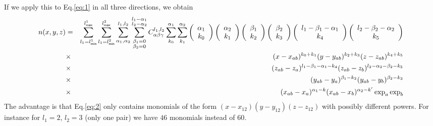 \documentclass[prb]{revtex4}
\begin{document}
If we apply this to Eq.\ref{eq:1} in all three directions, we obtain
\begin{eqnarray}
  \label{eq:collocate:4}
  n(x,y,z)  &=&
            \sum_{l_1 = l_{\sf min}^1}^{l_{\sf max}^1} \sum_{l_1 = l_{\sf min}^2}^{l_{\sf max}^2} \sum_{\alpha_1,\alpha_2}^{l_1,l_2} \sum_{\substack{\beta_1 = 0\\\beta_2 = 0}} ^{\substack{l_1 - \alpha_1\\l_2 - \alpha_2}}  C^{l_1,l_2}_{\alpha\beta\gamma} \sum_{k_0} ^ {\alpha_1}\sum_{k_1} ^ {\alpha_2} \left(
            \begin{array}{c}
              {\alpha_1}\\
              k_0\end{array}
              \right)
              \left(
              \begin{array}{c}
                \alpha_2\\
                k_1
              \end{array}\right)
              \left(\begin{array}{c}
                \beta_1\\
                k_2\end{array}
                \right)
                \left(
                \begin{array}{c}
                  \beta_2\\
                  k_3
                \end{array}\right)
                \left(\begin{array}{c}
                  l_1 - \beta_1 - \alpha_1\\
                  k_4\end{array}
                  \right)
                  \left(
                  \begin{array}{c}
                    l_2 - \beta_2 - \alpha_2\\
                    k_5
                  \end{array}\right)\nonumber\\ &\times&
                  (x-x_{ab})^{k_0+k_1} (y-y_{ab})^{k_2+k_3} (z - z_{ab}) ^ {k_4 + k_5}\nonumber\\ &\times& (z_{ab} - z_a) ^{l_1 - \beta_1 - \alpha_1 - k_4} (z_{ab} - z_b)^{l_2 - \alpha_2 - \beta_2-k_5}\nonumber  \\ &\times& (y_{ab} - y_a) ^{\beta_1 - k_2} (y_{ab} - y_b)^{\beta_2-k_3}\nonumber \\ &\times& (x_{ab}-x_a)^{\alpha_1 - k} (x_{ab}-x_b)^{\alpha_2 - k'} \exp_a\exp_b
\end{eqnarray}
The advantage is that Eq.\ref{eq:2} only contains monomials of the form
$(x-x_{12}) (y-y_{12}) (z-z_{12})$ with possibly different powers. For instance
for $l_1 = 2$, $l_2 = 3$ (only one pair) we have $46$ monomials instead of $60$.
\end{document}
